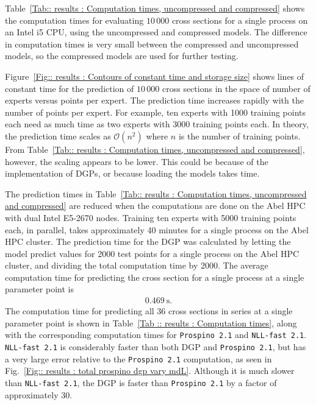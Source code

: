 \documentclass[twoside,english]{uiofysmaster}
\begin{document}
{{Table~\ref{Tab:: results : Computation times, uncompressed and compressed} shows the computation times for evaluating  $10\,000$ cross sections for a single process on an Intel i5 CPU, using the uncompressed and compressed models. The difference in computation times is very small between the compressed and uncompressed models, so the compressed models are used for further testing. 

Figure~\ref{Fig:: results : Contours of constant time and storage size} shows lines of constant time  for the prediction of $10\,000$ cross sections in the space of number of experts versus points per expert. The prediction time increases rapidly with the number of points per expert. For example, ten experts with 1000 training points each need as much time as two experts with 3000 training points each. In theory, the prediction time scales as $\mathcal{O}(n^2)$ where $n$ is the number of training points. From Table~\ref{Tab:: results : Computation times, uncompressed and compressed}, however, the scaling appears to be lower. This could be because of the implementation of DGPs, or because loading the models takes time.

The prediction times in Table~\ref{Tab:: results : Computation times, uncompressed and compressed} are reduced when the computations are done on the Abel HPC with dual Intel E5-2670 nodes. Training ten experts with 5000 training points each, in parallel, takes approximately 40 minutes for a single process on the Abel HPC cluster. The prediction time for the DGP was calculated by letting the model predict values for 2000 test points for a  single process on the Abel HPC cluster, and dividing the total computation time by 2000. The average computation time for predicting the cross section for a single process at a single parameter point is
\begin{align*}
0.469~\mathrm{s}.
\end{align*}
The computation time for predicting all 36 cross sections in series at a single parameter point is shown in Table~\ref{Tab :: results : Computation times}, along with the corresponding computation times for \verb|Prospino 2.1| and  \verb|NLL-fast 2.1|. \verb|NLL-fast 2.1| is considerably faster than both DGP and \verb|Prospino 2.1|, but has a very large error relative to the \verb|Prospino 2.1| computation, as seen in Fig.~\ref{Fig:: results : total prospino dgp vary mdL}. Although it is much slower than \verb|NLL-fast 2.1|, the DGP is faster than \verb|Prospino 2.1| by a factor of approximately $30$.

}}
\end{document}
